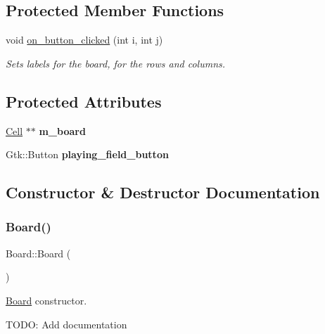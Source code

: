 \subsection*{Protected Member Functions}
\begin{DoxyCompactItemize}
\item 
void \mbox{\hyperlink{classBoard_a44a9162801e5db0c3b4e54d002038601}{on\+\_\+button\+\_\+clicked}} (int i, int j)
\begin{DoxyCompactList}\small\item\em Sets labels for the board, for the rows and columns. \end{DoxyCompactList}\end{DoxyCompactItemize}
\subsection*{Protected Attributes}
\begin{DoxyCompactItemize}
\item 
\mbox{\label{classBoard_a754a436a2eab4e5c530fdea298778582}} 
\mbox{\hyperlink{classCell}{Cell}} $\ast$$\ast$ {\bfseries m\+\_\+board}
\item 
\mbox{\label{classBoard_a11fea1e3b8d31647ab1bf77548f79623}} 
Gtk\+::\+Button {\bfseries playing\+\_\+field\+\_\+button}
\end{DoxyCompactItemize}


\subsection{Constructor \& Destructor Documentation}
\mbox{\label{classBoard_a9ee491d4fea680cf69b033374a9fdfcb}} 
\subsubsection{\texorpdfstring{Board()}{Board()}}
{\footnotesize\ttfamily Board\+::\+Board (\begin{DoxyParamCaption}{ }\end{DoxyParamCaption})}



\mbox{\hyperlink{classBoard}{Board}} constructor. 

T\+O\+DO\+: Add documentation \mbox{\label{classBoard_a2fba9e5428840eb48645c078b9f0dcce}} 

